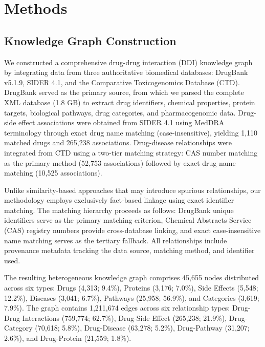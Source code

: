 \documentclass[11pt,a4paper]{article}
\begin{document}
\section*{Methods}

\subsection*{Knowledge Graph Construction}

We constructed a comprehensive drug-drug interaction (DDI) knowledge graph by integrating data from three authoritative biomedical databases: DrugBank v5.1.9, SIDER 4.1, and the Comparative Toxicogenomics Database (CTD). DrugBank served as the primary source, from which we parsed the complete XML database (1.8 GB) to extract drug identifiers, chemical properties, protein targets, biological pathways, drug categories, and pharmacogenomic data. Drug-side effect associations were obtained from SIDER 4.1 using MedDRA terminology through exact drug name matching (case-insensitive), yielding 1,110 matched drugs and 265,238 associations. Drug-disease relationships were integrated from CTD using a two-tier matching strategy: CAS number matching as the primary method (52,753 associations) followed by exact drug name matching (10,525 associations).

Unlike similarity-based approaches that may introduce spurious relationships, our methodology employs exclusively fact-based linkage using exact identifier matching. The matching hierarchy proceeds as follows: DrugBank unique identifiers serve as the primary matching criterion, Chemical Abstracts Service (CAS) registry numbers provide cross-database linking, and exact case-insensitive name matching serves as the tertiary fallback. All relationships include provenance metadata tracking the data source, matching method, and identifier used.

The resulting heterogeneous knowledge graph comprises 45,655 nodes distributed across six types: Drugs (4,313; 9.4\%), Proteins (3,176; 7.0\%), Side Effects (5,548; 12.2\%), Diseases (3,041; 6.7\%), Pathways (25,958; 56.9\%), and Categories (3,619; 7.9\%). The graph contains 1,211,674 edges across six relationship types: Drug-Drug Interactions (759,774; 62.7\%), Drug-Side Effect (265,238; 21.9\%), Drug-Category (70,618; 5.8\%), Drug-Disease (63,278; 5.2\%), Drug-Pathway (31,207; 2.6\%), and Drug-Protein (21,559; 1.8\%).
\end{document}
